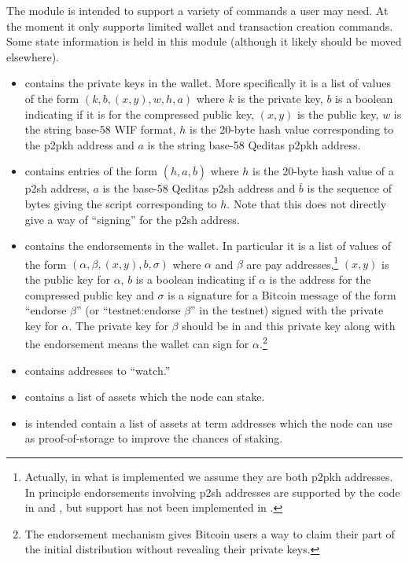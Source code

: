 The module {} is intended to support a variety of commands a user may need.
At the moment it only supports limited wallet and transaction creation commands.
Some state information is held in this module (although it likely should be moved elsewhere).
\begin{itemize}
\item {} contains the private keys in the wallet.
More specifically it is a list of values of the form $(k,b,(x,y),w,h,a)$
where $k$ is the private key, $b$ is a boolean indicating if it is for the compressed public key,
$(x,y)$ is the public key, $w$ is the string base-58 WIF format, $h$ is the 20-byte hash value
corresponding to the p2pkh address and $a$ is the string base-58 Qeditas p2pkh address.
\item {} contains entries of the form $(h,a,\overline{b})$
where $h$ is the 20-byte hash value of a p2sh address, $a$ is the base-58 Qeditas p2sh address
and $\overline{b}$ is the sequence of bytes giving the script corresponding to $h$.
Note that this does not directly give a way of ``signing'' for the p2sh address.
\item {} contains the endorsements in the wallet.
In particular it is a list of values of the form $(\alpha,\beta,(x,y),b,\sigma)$
where $\alpha$ and $\beta$ are pay addresses,\footnote{Actually, in what is implemented we assume they are both p2pkh addresses. In principle endorsements involving p2sh addresses are supported by the code in {} and {}, but support has not been implemented in {}.}
$(x,y)$ is the public key for $\alpha$,
$b$ is a boolean indicating if $\alpha$ is the address for the compressed public key
and $\sigma$ is a signature for a
Bitcoin message of the form ``endorse $\beta$''
(or ``testnet:endorse $\beta$'' in the testnet)
signed with the private key for $\alpha$.
The private key for $\beta$ should be in {}
and this private key along with the endorsement means the wallet can sign for $\alpha$.\footnote{The endorsement mechanism gives Bitcoin users a way to claim their part of the initial distribution without revealing their private keys.}
\item {}
contains addresses to ``watch.'' 
\item {}
contains a list of assets which the node can stake.
\item {}
is intended contain a list of assets at term addresses which the node can use as proof-of-storage to improve the chances of staking.

\end{itemize}
